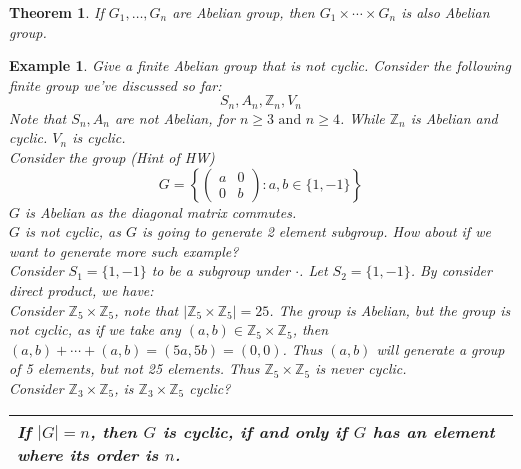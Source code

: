 \documentclass{article}
\theoremstyle{MyNonumberplain}
\theoremstyle{break}
\newcommand{\infixand}{\text{ and }}
\theoremstyle{break}
\newtheorem{theorem}{Theorem}[section]
\newtheorem{example}{Example}[section]
\theoremstyle{break}
\theoremstyle{definition}
\theoremstyle{break}
\begin{document}
\begin{thmbox}
    \begin{theorem}
        If $G_1, \ldots, G_n$ are Abelian group, then $G_1 \times \cdots \times G_n$
        is also Abelian group. 
    \end{theorem}

\end{thmbox}


\begin{expbox}
    \begin{example}
        Give a finite Abelian group that is not cyclic.
        Consider the following finite group we've discussed so far:
        \[ S_n, A_n, \mathbb{Z}_n, V_n \]
        Note that $S_n, A_n$ are not Abelian, for $n \geq 3 \infixand n \geq 4$. While
        $\mathbb{Z}_n$ is Abelian and cyclic. $V_n$ is cyclic.\\

        Consider the group (Hint of HW)
        \[ G = \left\{ \left(\begin{array}{cc}
            a & 0\\
            0 & b
        \end{array}\right) : a, b \in \{ 1, - 1 \} \right\} \]
        $G$ is Abelian as the diagonal matrix commutes.\\

        $G$ is not cyclic, as $G$ is going to generate 2 element subgroup. How about
        if we want to generate more such example?\\

        Consider $S_1 = \{ 1, - 1 \}$ to be a subgroup under $\cdot$. Let $S_2 = \{ 1,
        - 1 \}$. By consider direct product, we have:\\

        Consider $\mathbb{Z}_5 \times \mathbb{Z}_5$, note that $| \mathbb{Z}_5 \times
        \mathbb{Z}_5 | = 25$. The group is Abelian, but the group is not cyclic, as if
        we take any $(a, b) \in \mathbb{Z}_5 \times \mathbb{Z}_5$, then $(a, b) +
        \cdots + (a, b) = (5 a, 5 b) = (0, 0)$. Thus $(a, b)$ will generate a group of
        5 elements, but not 25 elements. Thus $\mathbb{Z}_5 \times \mathbb{Z}_5$ is
        never cyclic.\\

        Consider $\mathbb{Z}_3 \times \mathbb{Z}_5$, is $\mathbb{Z}_3 \times
        \mathbb{Z}_5$ cyclic?\\

        {\noindent}\begin{tabularx}{1.0\textwidth}{|@{}X@{}|}
        \hline
        If $| G | = n$, then $G$ is cyclic, if and only if $G$ has an element where
        its order is $n$.\\
        \hline
        \end{tabularx}\\


\end{example}
\end{expbox}
\end{document}
